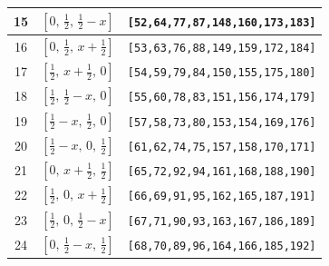 \documentclass[fleqn,8pt]{jsarticle}
\begin{document}
\begin{longtable}{ccc}
15 & $\left[ 0,\, \frac{1}{2},\, \frac{1}{2} - x \right]$ & {\tt [52,64,77,87,148,160,173,183]} \\ \hline
16 & $\left[ 0,\, \frac{1}{2},\, x + \frac{1}{2} \right]$ & {\tt [53,63,76,88,149,159,172,184]} \\ \hline
17 & $\left[ \frac{1}{2},\, x + \frac{1}{2},\, 0 \right]$ & {\tt [54,59,79,84,150,155,175,180]} \\ \hline
18 & $\left[ \frac{1}{2},\, \frac{1}{2} - x,\, 0 \right]$ & {\tt [55,60,78,83,151,156,174,179]} \\ \hline
19 & $\left[ \frac{1}{2} - x,\, \frac{1}{2},\, 0 \right]$ & {\tt [57,58,73,80,153,154,169,176]} \\ \hline
20 & $\left[ \frac{1}{2} - x,\, 0,\, \frac{1}{2} \right]$ & {\tt [61,62,74,75,157,158,170,171]} \\ \hline
21 & $\left[ 0,\, x + \frac{1}{2},\, \frac{1}{2} \right]$ & {\tt [65,72,92,94,161,168,188,190]} \\ \hline
22 & $\left[ \frac{1}{2},\, 0,\, x + \frac{1}{2} \right]$ & {\tt [66,69,91,95,162,165,187,191]} \\ \hline
23 & $\left[ \frac{1}{2},\, 0,\, \frac{1}{2} - x \right]$ & {\tt [67,71,90,93,163,167,186,189]} \\ \hline
24 & $\left[ 0,\, \frac{1}{2} - x,\, \frac{1}{2} \right]$ & {\tt [68,70,89,96,164,166,185,192]} \\
\end{longtable}
\renewcommand{\arraystretch}{1.2}
\end{document}
